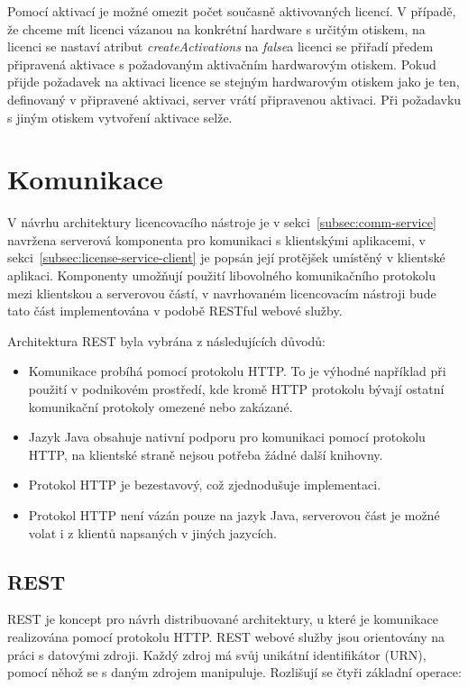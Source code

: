 Pomocí aktivací je možné omezit počet současně aktivovaných licencí. V případě,
že chceme mít licenci vázanou na konkrétní hardware s určitým otiskem, na
licenci se nastaví atribut \textit{createActivations} na \textit{false}a licenci
se přiřadí předem připravená aktivace s požadovaným aktivačním hardwarovým
otiskem. Pokud přijde požadavek na aktivaci licence se stejným hardwarovým
otiskem jako je ten, definovaný v připravené aktivaci, server vrátí připravenou
aktivaci. Při požadavku s jiným otiskem vytvoření aktivace selže.


\section{Komunikace}

V návrhu architektury licencovacího nástroje je v
sekci~\ref{subsec:comm-service} navržena serverová komponenta pro komunikaci s
klientskými aplikacemi, v sekci~\ref{subsec:license-service-client} je popsán
její protějšek umístěný v klientské aplikaci. Komponenty umožňují použití
libovolného komunikačního protokolu mezi klientskou a serverovou částí, v
navrhovaném licencovacím nástroji bude tato část implementována v podobě RESTful
webové služby.

Architektura \gls{REST} byla vybrána z následujících důvodů:
\begin{itemize}
  \item Komunikace probíhá pomocí protokolu \gls{HTTP}. To je výhodné například
  při použití v podnikovém prostředí, kde kromě \gls{HTTP} protokolu bývají
  ostatní komunikační protokoly omezené nebo zakázané.
  \item Jazyk Java obsahuje nativní podporu pro komunikaci pomocí protokolu
  \gls{HTTP}, na klientské straně nejsou potřeba žádné další knihovny.
  \item Protokol \gls{HTTP} je bezestavový, což zjednodušuje implementaci.
  \item Protokol \gls{HTTP} není vázán pouze na jazyk Java, serverovou část je
  možné volat i z klientů napsaných v jiných jazycích.
\end{itemize}

\subsection{REST}

\gls{REST} je koncept pro návrh distribuované architektury, u které je
komunikace realizována pomocí protokolu \gls{HTTP}. \gls{REST} webové služby
jsou orientovány na práci s datovými zdroji. Každý zdroj má svůj unikátní
identifikátor (\gls{URN}), pomocí něhož se s daným zdrojem manipuluje. Rozlišují
se čtyři základní operace:

